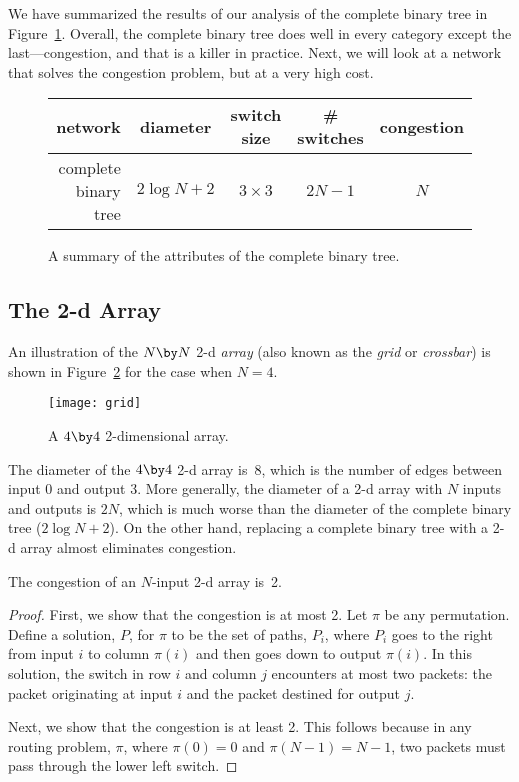We have summarized the results of our analysis of the complete binary
tree in Figure~\ref{fig:6EK}.  Overall, the complete binary tree does
well in every category except the last---congestion, and that is a
killer in practice.  Next, we will look at a network that solves the
congestion problem, but at a very high cost.

\begin{figure}

\begin{tabular}{r|c|c|c|c}
\textbf{network} &
\textbf{diameter} &
\textbf{switch size} &
\textbf{\# switches} &
\textbf{congestion} \\ \hline
complete binary tree & $2 \log N + 2$ & $3 \times 3$ & $2N - 1$ & $N$
\end{tabular}

\caption{A summary of the attributes of the complete binary tree.}

\label{fig:6EK}

\end{figure}

\subsection{The 2-d Array}\label{sec:2d-array}

An illustration of the $N \by N$ 2-d \emph{array} (also known as the
\emph{grid} or \emph{crossbar}) is shown in Figure~\ref{fig:6EL} for
the case when $N = 4$.

\begin{figure}

\texttt{[image: grid]}

\caption{A $4 \by 4$ 2-dimensional array.}

\label{fig:6EL}

\end{figure}

The diameter of the $4 \by 4$ 2-d array is~8, which is the number of
edges between input 0 and output 3.  More generally, the diameter of a
2-d array with $N$ inputs and outputs is $2N$, which is much worse
than the diameter of the complete binary tree ($2 \log N + 2$).  On
the other hand, replacing a complete binary tree with a 2-d array
almost eliminates congestion.

\begin{theorem}
The congestion of an $N$-input 2-d array is~2.
\end{theorem}

\begin{proof}
First, we show that the congestion is at most 2.  Let $\pi$ be any
permutation.  Define a solution, $P$, for $\pi$ to be the set of
paths, $P_i$, where $P_i$ goes to the right from input $i$ to column
$\pi(i)$ and then goes down to output $\pi(i)$.  In this solution, the
switch in row $i$ and column $j$ encounters at most two packets: the
packet originating at input $i$ and the packet destined for output
$j$.

Next, we show that the congestion is at least 2.  This follows because in
any routing problem, $\pi$, where $\pi(0) = 0$ and $\pi(N-1) =
N-1$, two packets must pass through the lower left switch.
\end{proof}

